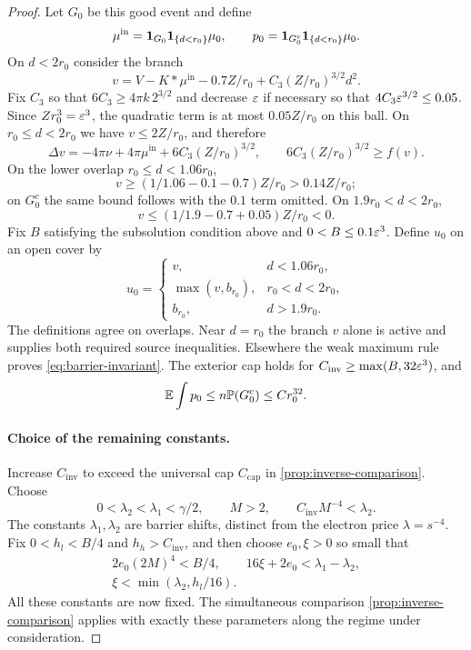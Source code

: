 \begin{proof}
Let $G_0$ be this good event and define
\[
 \mu^{\mathrm{in}}=\mathbf 1_{G_0}\mathbf 1_{\{d<r_0\}}\mu_0,
 \qquad p_0=\mathbf 1_{G_0^c}\mathbf 1_{\{d<r_0\}}\mu_0.
\]
On $d<2r_0$ consider the branch
\[
 v=V-K*\mu^{\mathrm{in}}-0.7Z/r_0
                +C_3(Z/r_0)^{3/2}d^2.
\]
Fix $C_3$ so that $6C_3\ge4\pi k\,2^{3/2}$ and decrease $\varepsilon$
if necessary so that $4C_3\varepsilon^{3/2}\le0.05$.  Since
$Zr_0^3=\varepsilon^3$, the quadratic term is at most $0.05Z/r_0$ on
this ball.  On $r_0\le d<2r_0$ we have $v\le2Z/r_0$, and therefore
\[
 \Delta v=-4\pi\nu+4\pi\mu^{\mathrm{in}}
                   +6C_3(Z/r_0)^{3/2},
 \qquad 6C_3(Z/r_0)^{3/2}\ge f(v).
\]
On the lower overlap $r_0\le d<1.06r_0$,
\[
 v\ge(1/1.06-0.1-0.7)Z/r_0>0.14Z/r_0;
\]
on $G_0^c$ the same bound follows with the $0.1$ term omitted.
On $1.9r_0<d<2r_0$,
\[
 v\le(1/1.9-0.7+0.05)Z/r_0<0.
\]
Fix $B$ satisfying the subsolution condition above and
$0<B\le0.1\varepsilon^3$.  Define $u_0$ on an open cover by
\[
 u_0=
 \begin{cases}
 v,&d<1.06r_0,\\
 \max(v,b_{r_0}),&r_0<d<2r_0,\\
 b_{r_0},&d>1.9r_0.
 \end{cases}
\]
The definitions agree on overlaps.  Near $d=r_0$ the branch $v$
alone is active and supplies both required source inequalities.
Elsewhere the weak maximum rule proves
\cref{eq:barrier-invariant}.  The exterior cap holds for
$C_{\mathrm{inv}}\ge\max(B,32\varepsilon^3)$, and
\[
 \mathbb E\int p_0\le n\mathbb P(G_0^c)\le Cr_0^{32}.
\]

\paragraph{Choice of the remaining constants.}
Increase $C_{\mathrm{inv}}$ to exceed the universal cap
$C_{\mathrm{cap}}$ in \cref{prop:inverse-comparison}.
Choose
\[
 0<\lambda_2<\lambda_1<\gamma/2,
 \qquad M>2,\qquad C_{\mathrm{inv}}M^{-4}<\lambda_2.
\]
The constants $\lambda_1,\lambda_2$ are barrier shifts, distinct from
the electron price $\lambda=s^{-4}$.  Fix
$0<h_l<B/4$ and $h_h>C_{\mathrm{inv}}$, and then choose
$e_0,\xi>0$ so small that
\begin{equation}\label{eq:barrier-parameters}
 \begin{gathered}
 2e_0(2M)^4<B/4,\qquad
 16\xi+2e_0<\lambda_1-\lambda_2,\\
 \xi<\min(\lambda_2,h_l/16).
 \end{gathered}
\end{equation}
All these constants are now fixed.  The simultaneous comparison
\cref{prop:inverse-comparison} applies with exactly these parameters
along the regime under consideration.


\end{proof}
